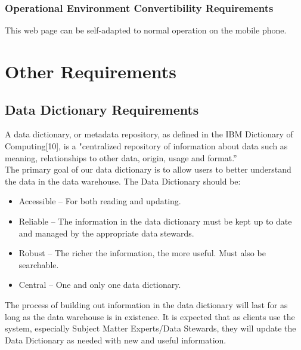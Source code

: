 \documentclass[16pt]{scrreprt}
\begin{document}
\subsection{Operational Environment Convertibility Requirements}
This web page can be self-adapted to normal operation on the mobile phone.


\chapter{Other Requirements}
\label{Other Requirements}

\section{Data Dictionary Requirements}
A data dictionary, or metadata repository, as defined in the IBM Dictionary of Computing[10], is a "centralized repository of information about data such as meaning, relationships to other data, origin, usage and format.”\\

\noindent The primary goal of our data dictionary is to allow users to better understand the data in the data
warehouse. 
The Data Dictionary should be:
\begin{itemize}
    \item Accessible – For both reading and updating.
\item Reliable – The information in the data dictionary must be kept up to date and managed by the appropriate data stewards.
\item Robust – The richer the information, the more useful. Must also be searchable.
\item Central – One and only one data dictionary.
\end{itemize}
The process of building out information in the data dictionary will last for as long as the data warehouse is in existence. It is expected that as clients use the system, especially Subject Matter Experts/Data Stewards, they will update the Data Dictionary as needed with new and useful information.\\
\end{document}
